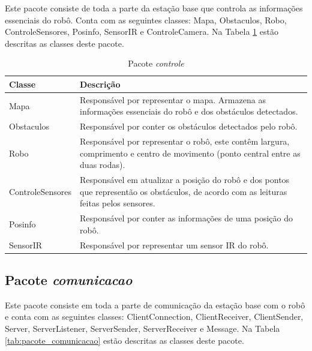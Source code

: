 Este pacote consiste de toda a parte da estação base que controla as informações essenciais do robô. Conta com as seguintes classes: Mapa, Obstaculos, Robo, ControleSensores, Posinfo, SensorIR e ControleCamera. Na Tabela \ref{tab:pacote_controle} estão descritas as classes deste pacote.

\begin{table}[h]
  \centering
  \caption{Pacote \textit{controle}}
    \begin{tabular}{p{6cm}p{8cm}}
    \toprule
    \textbf{Classe} & \textbf{Descrição} \\ 
    \midrule
    Mapa  & Responsável por representar o mapa. Armazena as informações essenciais do robô e dos obstáculos detectados. \\ \hline
    Obstaculos & Responsável por conter os obstáculos detectados pelo robô. \\ \hline
    Robo  & Responsável por representar o robô, este contêm largura, comprimento e centro de movimento (ponto central entre as duas rodas). \\ \hline
    ControleSensores & Responsável em atualizar a posição do robô e dos pontos que representão os obstáculos, de acordo com as leituras feitas pelos sensores. \\ \hline
    Posinfo & Responsável por conter as informações de uma posição do robô. \\ \hline
    SensorIR & Responsável por representar um sensor IR do robô. \\ 
    \bottomrule
    \end{tabular}%
  \label{tab:pacote_controle}%
\end{table}%

\subsection{Pacote \textit{comunicacao}}

Este pacote consiste em toda a parte de comunicação da estação base com o robô e conta com as seguintes classes: ClientConnection, ClientReceiver, ClientSender, Server, ServerListener, ServerSender, ServerReceiver e Message. Na Tabela \ref{tab:pacote_comunicacao} estão descritas as classes deste pacote.

